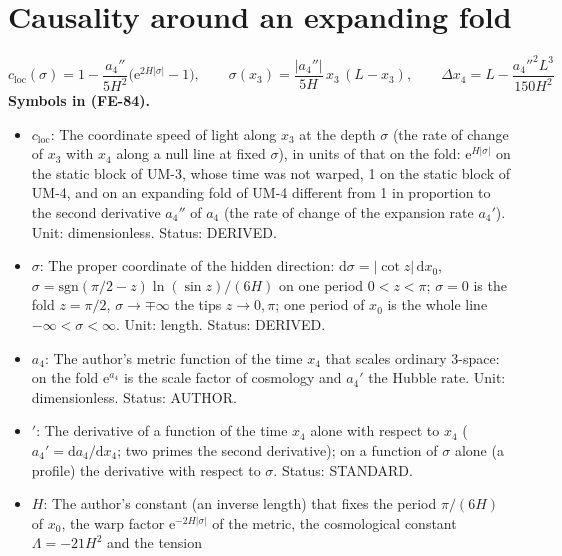\documentclass[
  10pt,
]{article}
\providecommand{\tightlist}{%
  \setlength{\itemsep}{0pt}\setlength{\parskip}{0pt}}
\begin{document}
\hypertarget{causality-around-an-expanding-fold}{%
\section{Causality around an expanding
fold}\label{causality-around-an-expanding-fold}}

\[
c_{\mathrm{loc}}(\sigma) = 1 - \frac{a_4''}{5H^2}\big(\mathrm{e}^{2H\lvert\sigma\rvert} - 1\big),\qquad
\sigma(x_3) = \frac{\lvert a_4''\rvert}{5H}\,x_3\,(L - x_3),\qquad
\Delta x_4 = L - \frac{a_4''^2L^3}{150H^2} \tag{FE-84}
\] \textbf{Symbols in (FE-84).}

\begin{itemize}
\tightlist
\item
  \(c_{\mathrm{loc}}\): The coordinate speed of light along \(x_3\) at
  the depth \(\sigma\) (the rate of change of \(x_3\) with \(x_4\) along
  a null line at fixed \(\sigma\)), in units of that on the fold:
  \(\mathrm{e}^{H\lvert\sigma\rvert}\) on the static block of UM-3,
  whose time was not warped, 1 on the static block of UM-4, and on an
  expanding fold of UM-4 different from 1 in proportion to the second
  derivative \(a_4''\) of \(a_4\) (the rate of change of the expansion
  rate \(a_4'\)). Unit: dimensionless. Status: DERIVED.
\item
  \(\sigma\): The proper coordinate of the hidden direction:
  \(\mathrm{d}\sigma = \lvert\cot z\rvert\,\mathrm{d}x_0\),
  \(\sigma = \mathrm{sgn}(\pi/2 - z)\ln(\sin z)/(6H)\) on one period
  \(0 < z < \pi\); \(\sigma = 0\) is the fold \(z = \pi/2\),
  \(\sigma \to \mp\infty\) the tips \(z \to 0, \pi\); one period of
  \(x_0\) is the whole line \(-\infty < \sigma < \infty\). Unit: length.
  Status: DERIVED.
\item
  \(a_4\): The author's metric function of the time \(x_4\) that scales
  ordinary 3-space: on the fold \(\mathrm{e}^{a_4}\) is the scale factor
  of cosmology and \(a_4'\) the Hubble rate. Unit: dimensionless.
  Status: AUTHOR.
\item
  \({}'\): The derivative of a function of the time \(x_4\) alone with
  respect to \(x_4\) (\(a_4' = \mathrm{d}a_4/\mathrm{d}x_4\); two primes
  the second derivative); on a function of \(\sigma\) alone (a profile)
  the derivative with respect to \(\sigma\). Status: STANDARD.
\item
  \(H\): The author's constant (an inverse length) that fixes the period
  \(\pi/(6H)\) of \(x_0\), the warp factor
  \(\mathrm{e}^{-2H\lvert\sigma\rvert}\) of the metric, the cosmological
  constant \(\Lambda = -21H^2\) and the tension

\end{itemize}
\end{document}
